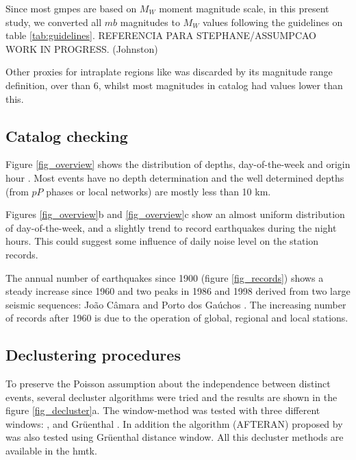 \documentclass[draft, grl]{agutex}
\begin{document}
\begin{article}
Since most \glspl{gmpe} are based on $M_W$ moment magnitude scale, in this present study, we converted all $mb$ magnitudes to $M_W$ values following the guidelines on table \ref{tab:guidelines}. REFERENCIA PARA STEPHANE/ASSUMPCAO WORK IN PROGRESS. (Johnston)

Other proxies for intraplate regions like \citet{scordilis_2006} was discarded by its magnitude range definition, over than 6, whilst most magnitudes in \citet{bsb_2014} catalog had values lower than this.


\subsection{Catalog checking}

Figure \ref{fig_overview} shows the distribution of depths, day-of-the-week and origin hour \citep{gulia_2012}. Most events have no depth determination and the well determined depths (from $pP$ phases or local networks) are mostly less than 10 km.

Figures \ref{fig_overview}b and \ref{fig_overview}c show an almost uniform distribution of day-of-the-week, and a slightly trend to record earthquakes during the night hours. This could suggest some influence of daily noise level on the station records.

The annual number of earthquakes since 1900 (figure \ref{fig_records}) shows a steady increase since 1960 and two peaks in 1986 and 1998 derived from two large seismic sequences: João Câmara \citep{takeya_1989} and Porto dos Gaúchos \citep{barros_2009}. The increasing number of records after 1960 is due to the operation of global, regional and local stations.



\subsection{Declustering procedures}

To preserve the Poisson assumption about the independence between distinct events, several decluster algorithms were tried and the results are shown in the figure \ref{fig_decluster}a. The window-method \citep{gardner_1974} was tested with three different windows: \citet{gardner_1974}, \citet{uhrhammer_1986} and Gr\"uenthal \citep{van_stiphout_2012}.
In addition the algorithm (AFTERAN) proposed by \citet{musson_1999} was also tested using Gr\"uenthal distance window. All this decluster methods are available in the \gls{hmtk}.


\end{article}
\end{document}
